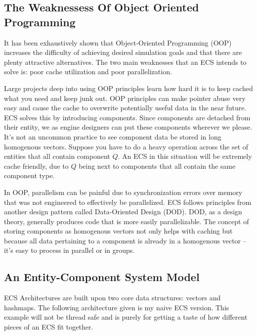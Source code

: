\subsection{The Weaknessess Of Object Oriented Programming}

It has been exhaustively shown that Object-Oriented Programming (OOP) increases the difficulty of achieving desired simulation goals and that there are plenty attractive alternatives. The two main weaknesses that an ECS intends to solve is: poor cache utilization and poor parallelization.

Large projects deep into using OOP principles learn how hard it is to keep cached what you need and keep junk out. OOP principles can make pointer abuse very easy and cause the cache to overwrite potentially useful data in the near future. ECS solves this by introducing components. Since components are detached from their entity, we as engine designers can put these components wherever we please. It's not an uncommon practice to see component data be stored in long homogenous vectors. Suppose you have to do a heavy operation across the set of entities that all contain component $Q$. An ECS in this situation will be extremely cache friendly, due to $Q$ being next to components that all contain the same component type.

In OOP, parallelism can be painful due to synchronization errors over memory that was not engineered to effectively be parallelized. ECS follows principles from another design pattern called Data-Oriented Design (DOD). DOD, as a design theory, generally produces code that is more easily parallelizable. The concept of storing components as homogenous vectors not only helps with caching but because all data pertaining to a component is already in a homogenous vector -- it's easy to process in parallel or in groups.

\subsection{An Entity-Component System Model}

ECS Architectures are built upon two core data structures: vectors and hashmaps. The following architecture given is my naive ECS version. This example will not be thread safe and is purely for getting a taste of how different pieces of an ECS fit together.

